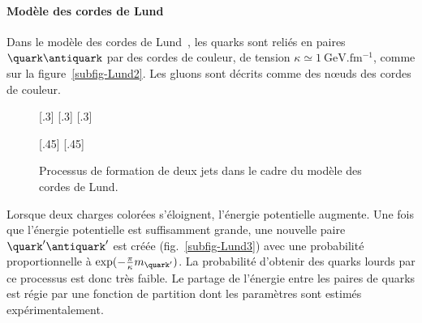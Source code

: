 \paragraph{Modèle des cordes de Lund}\label{chapter-MSSM-formation_jets-subsec-hadronisation-subsubsec-Lund}
Dans le modèle des cordes de Lund~\cite{Andersson_parton_fragmentation}, les quarks sont reliés en paires $\quark\antiquark$ par des \og cordes \fg{} de couleur, de tension $\kappa \simeq \SI{1}{\GeV.\femto\meter^{-1}}$, comme sur la figure~\ref{subfig-Lund2}. Les gluons sont décrits comme des nœuds des cordes de couleur.
\begin{figure}[h]
\centering
{}[.3\textwidth]
{}
\hfill
{}[.3\textwidth]
{}
\hfill
{}[.3\textwidth]
{}

\vspace{\baselineskip}

[.45\textwidth]
{}
\hfill
{}[.45\textwidth]
{}

\caption[Formation de jets dans le cadre du modèle des cordes de Lund.]{Processus de formation de deux jets dans le cadre du modèle des cordes de Lund.}
\label{fig-Lund}
\end{figure}
\par Lorsque deux charges colorées s'éloignent, l'énergie potentielle augmente.
Une fois que l'énergie potentielle est suffisamment grande, une nouvelle paire $\quark'\antiquark'$ est créée (fig.~\ref{subfig-Lund3}) avec une probabilité proportionnelle à $\exp(-\frac{\pi}{\kappa} m_{\quark'})$.
La probabilité d'obtenir des quarks lourds par ce processus est donc très faible.
Le partage de l'énergie entre les paires de quarks est régie par une fonction de partition dont les paramètres sont estimés expérimentalement.
